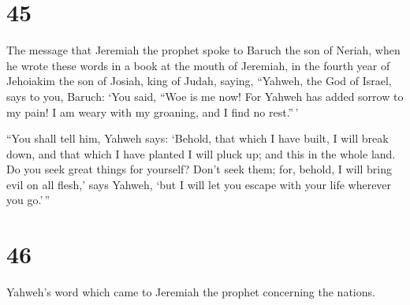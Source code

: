 \hypertarget{section-44}{%
\section{45}\label{section-44}}

 The message that Jeremiah the prophet spoke to Baruch the
son of Neriah, when he wrote these words in a book at the mouth of
Jeremiah, in the fourth year of Jehoiakim the son of Josiah, king of
Judah, saying,  ``Yahweh, the God of Israel, says to you,
Baruch:  `You said, ``Woe is me now! For Yahweh has added
sorrow to my pain! I am weary with my groaning, and I find no rest.''\,'

 ``You shall tell him, Yahweh says: `Behold, that which I
have built, I will break down, and that which I have planted I will
pluck up; and this in the whole land.  Do you seek great
things for yourself? Don't seek them; for, behold, I will bring evil on
all flesh,' says Yahweh, `but I will let you escape with your life
wherever you go.'\,''

\hypertarget{section-45}{%
\section{46}\label{section-45}}

 Yahweh's word which came to Jeremiah the prophet concerning
the nations.

